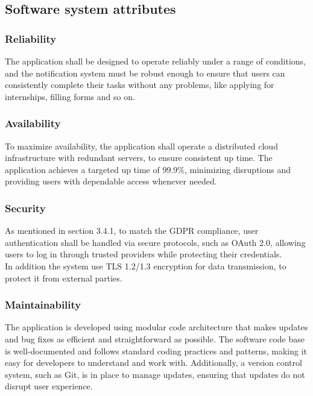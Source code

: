\documentclass[11pt,twoside]{article}
\begin{document}
	\subsection{Software system attributes}
		\subsubsection{Reliability}

The application shall be designed to operate reliably under a range of conditions, and the notification system must be robust enough to ensure that users can consistently complete their tasks without any problems, like applying for internships, filling forms and so on.
		
		\subsubsection{Availability}
		
To maximize availability, the application shall operate a distributed cloud infrastructure with redundant servers, to ensure consistent up time. The application achieves a targeted up time of 99.9\%, minimizing disruptions and providing users with dependable access whenever needed.
		
		\subsubsection{Security}
		
As mentioned in section 3.4.1, to match the GDPR compliance, user authentication shall be handled via secure protocols, such as OAuth 2.0, allowing users to log in through trusted providers while protecting their credentials. \\
In addition the system use TLS 1.2/1.3 encryption for data transmission, to protect it from external parties.
		
		\subsubsection{Maintainability}
		
The application is developed using modular code architecture that makes updates and bug fixes as efficient and straightforward as possible. The software code base is well-documented and follows standard coding practices and patterns, making it easy for developers to understand and work with. Additionally, a version control system, such as Git, is in place to manage updates, ensuring that updates do not disrupt user experience.
		
\end{document}

